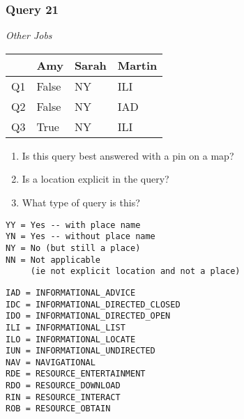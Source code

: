 \begin{frame}[fragile]
\frametitle{Query 21}
\vspace{1em}

\emph{Other Jobs}

\vfill

\begin{table}
  \centering
  \begin{tabular}{ l l l l }
    & \textbf{Amy} & \textbf{Sarah} & \textbf{Martin}\\
    \toprule
    Q1 & False & NY & ILI\\
Q2 & False & NY & IAD\\
Q3 & True & NY & ILI\\
    \bottomrule
  \end{tabular}
\end{table}

\vfill

\tiny{

\begin{enumerate}
\item Is this query best answered with a pin on a map?
\item Is a location explicit in the query?
\item What type of query is this?
\end{enumerate}

\vfill

\begin{multicols}{2}
\begin{verbatim}
YY = Yes -- with place name
YN = Yes -- without place name
NY = No (but still a place)
NN = Not applicable 
     (ie not explicit location and not a place)
\end{verbatim}

\columnbreak
\begin{verbatim}
IAD = INFORMATIONAL_ADVICE
IDC = INFORMATIONAL_DIRECTED_CLOSED
IDO = INFORMATIONAL_DIRECTED_OPEN
ILI = INFORMATIONAL_LIST
ILO = INFORMATIONAL_LOCATE
IUN = INFORMATIONAL_UNDIRECTED
NAV = NAVIGATIONAL
RDE = RESOURCE_ENTERTAINMENT
RDO = RESOURCE_DOWNLOAD
RIN = RESOURCE_INTERACT
ROB = RESOURCE_OBTAIN
\end{verbatim}
\end{multicols}
}

\end{frame}


